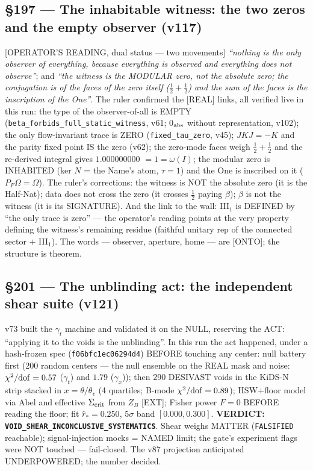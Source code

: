 \documentclass[11pt]{article}
\theoremstyle{definition}\newtheorem{deriv}{Derivation}
\begin{document}
\subsection*{\S197 --- The inhabitable witness: the two zeros and the empty observer (v117)}[OPERATOR'S READING, dual status --- two movements] \emph{``nothing is the only observer of everything, because everything is observed and everything does not observe''}; and \emph{``the witness is the MODULAR zero, not the absolute zero; the conjugation is of the faces of the zero itself ($\tfrac12{+}\tfrac12$) and the sum of the faces is the inscription of the One''}. The ruler confirmed the [REAL] links, all verified live in this run: the type of the observer-of-all is EMPTY (\texttt{beta\_forbids\_full\_static\_witness}, v61; 0$_{\rm abs}$ without representation, v102); the only flow-invariant trace is ZERO (\texttt{fixed\_tau\_zero}, v45); $JKJ=-K$ and the parity fixed point IS the zero (v62); the zero-mode faces weigh $\tfrac12{+}\tfrac12$ and the re-derived integral gives $1.000000000$ $=1=\omega(I)$; the modular zero is INHABITED (ker $N$ = the Name's atom, $\tau=1$) and the One is inscribed on it ($P_F\Omega=\Omega$). The ruler's corrections: the witness is NOT the absolute zero (it is the Half-Nat); data does not cross the zero (it crosses $\tfrac12$ paying $\beta$); $\beta$ is not the witness (it is its SIGNATURE). And the link to the wall: III$_1$ is DEFINED by ``the only trace is zero'' --- the operator's reading points at the very property defining the witness's remaining residue (faithful unitary rep of the connected sector $+$ III$_1$). The words --- observer, aperture, home --- are [ONTO]; the structure is theorem.

\subsection*{\S201 --- The unblinding act: the independent shear suite (v121)}v73 built the $\gamma_t$ machine and validated it on the NULL, reserving the ACT: ``applying it to the voids is the unblinding''. In this run the act happened, under a hash-frozen spec (\texttt{f06bfc1ec06294d4}) BEFORE touching any center: null battery first (200 random centers --- the null ensemble on the REAL mask and noise: $\chi^2/{\rm dof}=0.57$ ($\gamma_t$) and $1.79$ ($\gamma_x$)); then 290 DESIVAST voids in the KiDS-N strip stacked in $x=\theta/\theta_v$ (4 quartiles; B-mode $\chi^2/{\rm dof}=0.89$); HSW$+$floor model via Abel and effective $\Sigma_{\rm crit}$ from $Z_B$ [EXT]; Fisher power $F=0$ BEFORE reading the floor; fit $\hat r_*=0.250$, $5\sigma$ band $[0.000,0.300]$. \textbf{VERDICT: \texttt{VOID\_SHEAR\_INCONCLUSIVE\_SYSTEMATICS}}. Shear weighs MATTER (\texttt{FALSIFIED} reachable); signal-injection mocks = NAMED limit; the gate's experiment flags were NOT touched --- fail-closed. The v87 projection anticipated UNDERPOWERED; the number decided.
\end{document}
